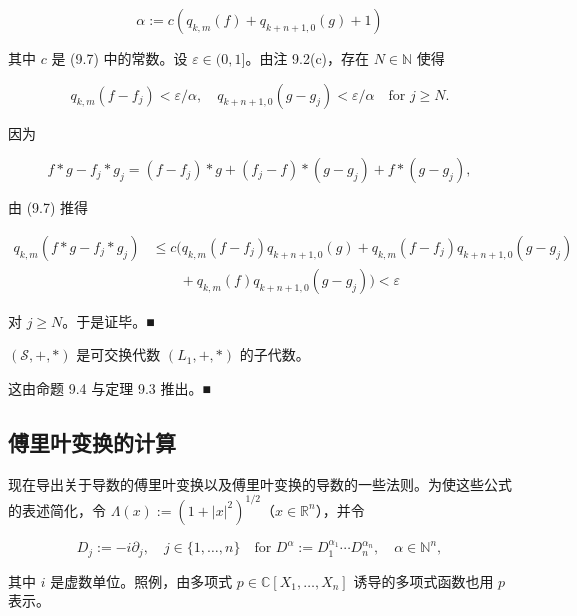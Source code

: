 \begin{proposition}
\begin{subitems}
\[
\alpha := c(q_{k,m}(f) + q_{k+n+1,0}(g) + 1)
\]

其中 $ c $ 是 (9.7) 中的常数。设 $ \varepsilon \in (0,1] $。由注 9.2(c)，存在 $ N \in \mathbb{N} $ 使得

\[
q_{k,m}(f-f_j) < \varepsilon/\alpha , \quad q_{k+n+1,0}(g-g_j) < \varepsilon/\alpha \quad \text{for } j \ge N .
\]

因为

\[
f*g - f_j*g_j = (f-f_j)*g + (f_j-f)*(g-g_j) + f*(g-g_j) ,
\]

由 (9.7) 推得

\begin{equation*}
\begin{aligned}
q_{k,m}(f*g-f_j*g_j) &\le c\big(q_{k,m}(f-f_j)q_{k+n+1,0}(g) + q_{k,m}(f-f_j)q_{k+n+1,0}(g-g_j) \\ &\qquad + q_{k,m}(f)q_{k+n+1,0}(g-g_j)\big) < \varepsilon
\end{aligned}
\end{equation*}

对 $ j \ge N $。于是证毕。\nobreak\hspace{0.35em}■

\end{subitems}

\end{proposition}

\begin{corollary}

$ (\mathcal{S},+,*) $ 是可交换代数 $ (L_1,+,*) $ 的子代数。

\proofhead
这由命题 9.4 与定理 9.3 推出。\nobreak\hspace{0.35em}■
\end{corollary}

\subsection*{傅里叶变换的计算}

现在导出关于导数的傅里叶变换以及傅里叶变换的导数的一些法则。为使这些公式的表述简化，令 $ \Lambda(x) := (1+|x|^2)^{1/2} $（$ x \in \mathbb{R}^n $），并令

\[
D_j := -i\partial_j , \quad j \in \{1,\ldots,n\} \quad \text{for } D^{\alpha} := D_1^{\alpha_1}\cdots D_n^{\alpha_n} , \quad \alpha \in \mathbb{N}^n ,
\]

其中 $ i $ 是虚数单位。照例，由多项式 $ p \in \mathbb{C}[X_1,\ldots,X_n] $ 诱导的多项式函数也用 $ p $ 表示。


